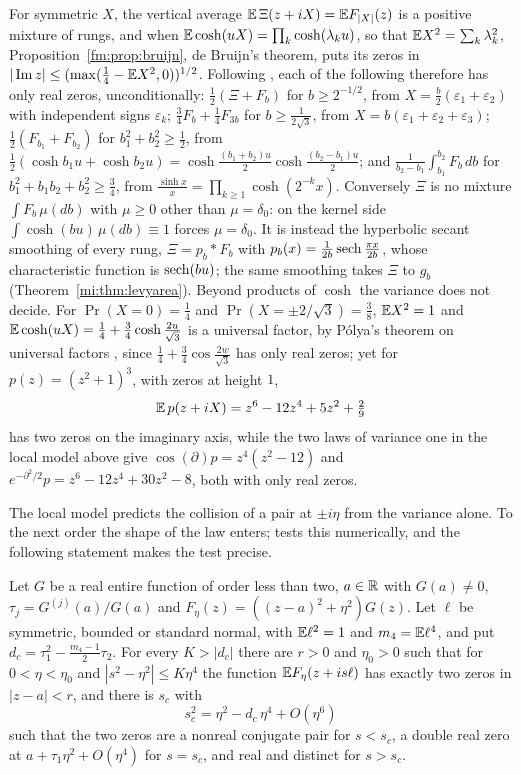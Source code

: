 \begin{remark}\label{mi:rem:mixtures}
For symmetric $X$, the vertical average $\mathbb{E}\,\Xi(z+iX)=\mathbb{E} F_{|X|}(z)$ is a positive mixture of rungs, and when $\mathbb{E}\cosh(uX)=\prod_k\cosh(\lambda_ku)$, so that $\mathbb{E} X^2=\sum_k\lambda_k^2$, Proposition~\ref{fm:prop:bruijn}, de Bruijn's theorem, puts its zeros in $|\operatorname{Im} z|\le(\max(\frac14-\mathbb{E} X^2,0))^{1/2}$. Following \cite{P26pg10}, each of the following therefore has only real zeros, unconditionally: $\frac12(\Xi+F_b)$ for $b\ge2^{-1/2}$, from $X=\frac b2(\varepsilon_1+\varepsilon_2)$ with independent signs $\varepsilon_k$; $\frac34F_b+\frac14F_{3b}$ for $b\ge\frac1{2\sqrt3}$, from $X=b(\varepsilon_1+\varepsilon_2+\varepsilon_3)$; $\frac12(F_{b_1}+F_{b_2})$ for $b_1^2+b_2^2\ge\frac12$, from $\frac12(\cosh b_1u+\cosh b_2u)=\cosh\frac{(b_1+b_2)u}2\cosh\frac{(b_2-b_1)u}2$; and $\frac1{b_2-b_1}\int_{b_1}^{b_2}F_b\,db$ for $b_1^2+b_1b_2+b_2^2\ge\frac34$, from $\frac{\sinh x}x=\prod_{k\ge1}\cosh(2^{-k}x)$. Conversely $\Xi$ is no mixture $\int F_b\,\mu(db)$ with $\mu\ge0$ other than $\mu=\delta_0$: on the kernel side $\int\cosh(bu)\,\mu(db)\equiv1$ forces $\mu=\delta_0$. It is instead the hyperbolic secant smoothing of every rung, $\Xi=p_b*F_b$ with $p_b(x)=\frac1{2b}\operatorname{sech}\frac{\pi x}{2b}$, whose characteristic function is $\operatorname{sech}(bu)$; the same smoothing takes $\Xi$ to $g_b$ (Theorem~\ref{mi:thm:levyarea}). Beyond products of $\cosh$ the variance does not decide. For $\Pr(X=0)=\frac14$ and $\Pr(X=\pm2/\sqrt3)=\frac38$, $\mathbb{E} X^2=1$ and $\mathbb{E}\cosh(uX)=\frac14+\frac34\cosh\frac{2u}{\sqrt3}$ is a universal factor, by P\'olya's theorem on universal factors \cite[p.~197]{deBruijn}, since $\frac14+\frac34\cos\frac{2w}{\sqrt3}$ has only real zeros; yet for $p(z)=(z^2+1)^3$, with zeros at height $1$,
\[
\mathbb{E}\,p(z+iX)=z^6-12z^4+5z^2+\tfrac29
\]
has two zeros on the imaginary axis, while the two laws of variance one in the local model above give $\cos(\partial)p=z^4(z^2-12)$ and $e^{-\partial^2/2}p=z^6-12z^4+30z^2-8$, both with only real zeros.
\end{remark}

The local model predicts the collision of a pair at $\pm i\eta$ from the variance alone. To the next order the shape of the law enters; \cite{P26pg10} tests this numerically, and the following statement makes the test precise.

\begin{proposition}\label{mi:prop:collision}
Let $G$ be a real entire function of order less than two, $a\in\mathbb{R}$ with $G(a)\ne0$, $\tau_j=G^{(j)}(a)/G(a)$ and $F_\eta(z)=((z-a)^2+\eta^2)G(z)$. Let $\ell$ be symmetric, bounded or standard normal, with $\mathbb{E}\ell^2=1$ and $m_4=\mathbb{E}\ell^4$, and put $d_c=\tau_1^2-\frac{m_4-1}2\tau_2$. For every $K>|d_c|$ there are $r>0$ and $\eta_0>0$ such that for $0<\eta<\eta_0$ and $|s^2-\eta^2|\le K\eta^4$ the function $\mathbb{E} F_\eta(z+is\ell)$ has exactly two zeros in $|z-a|<r$, and there is $s_c$ with
\[
s_c^2=\eta^2-d_c\,\eta^4+O(\eta^6)
\]
such that the two zeros are a nonreal conjugate pair for $s<s_c$, a double real zero at $a+\tau_1\eta^2+O(\eta^4)$ for $s=s_c$, and real and distinct for $s>s_c$.
\end{proposition}

